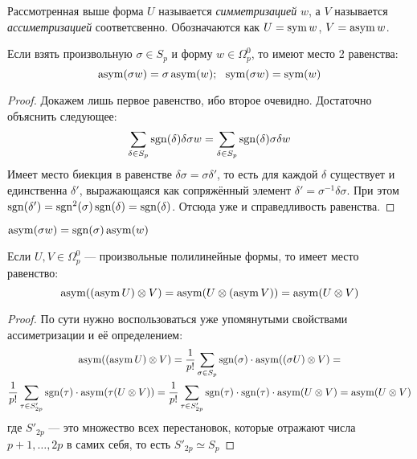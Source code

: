 \begin{definition}
	Рассмотренная выше форма $U$ называется \textit{симметризацией} $w$, а $V$ называется \textit{ассиметризацией} соответсвенно. Обозначаются как $U = \operatorname{sym} w$, $V = \operatorname{asym} w$.
\end{definition}

\begin{proposition}
	Если взять произвольную $\sigma \in S_p$ и форму $w \in \Omega_p^0$, то имеют место 2 равенства:
	\[
		\operatorname{asym}(\sigma w) = \sigma \operatorname{asym}(w);\ \ \operatorname{sym}(\sigma w) = \operatorname{sym}(w)
	\]
\end{proposition}

\begin{proof}
	Докажем лишь первое равенство, ибо второе очевидно. Достаточно объяснить следующее:
	\[
		\sum_{\delta \in S_p} \operatorname{sgn}(\delta) \delta \sigma w = \sum_{\delta \in S_p} \operatorname{sgn}(\delta) \sigma \delta w
	\]
	Имеет место биекция в равенстве $\delta \sigma = \sigma \delta'$, то есть для каждой $\delta$ существует и единственна $\delta'$, выражающаяся как сопряжённый элемент $\delta' = \sigma^{-1} \delta \sigma$. При этом $\operatorname{sgn}(\delta') = \operatorname{sgn}^2(\sigma) \operatorname{sgn}(\delta) = \operatorname{sgn}(\delta)$. Отсюда уже и справедливость равенства.
\end{proof}

\begin{corollary}
	\(\operatorname{asym}(\sigma w) = \operatorname{sgn}(\sigma) \operatorname{asym}(w)\)
\end{corollary}

\begin{lemma}
	Если $U, V \in \Omega_p^0$ --- произвольные полилинейные формы, то имеет место равенство:
	\[
		\operatorname{asym}((\operatorname{asym} U) \otimes V) = \operatorname{asym} (U \otimes (\operatorname{asym} V)) = \operatorname{asym}(U \otimes V)
	\]
\end{lemma}

\begin{proof}
	По сути нужно воспользоваться уже упомянутыми свойствами ассиметризации и её определением:
	\begin{multline*}
		\operatorname{asym}((\operatorname{asym} U) \otimes V) = \frac{1}{p!} \sum_{\sigma \in S_p} \operatorname{sgn}(\sigma) \cdot \operatorname{asym}((\sigma U) \otimes V) =
		\\
		\frac{1}{p!} \sum_{\tau \in S'_{2p}} \operatorname{sgn}(\tau) \cdot \operatorname{asym}(\tau(U \otimes V)) = \frac{1}{p!} \sum_{\tau \in S'_{2p}} \operatorname{sgn}(\tau) \cdot \operatorname{sgn}(\tau) \cdot \operatorname{asym}(U \otimes V) = \operatorname{asym}(U \otimes V)
	\end{multline*}
	где $S'_{2p}$ --- это множество всех перестановок, которые отражают числа $p + 1, \ldots, 2p$ в самих себя, то есть $S'_{2p} \simeq S_p$
\end{proof}

